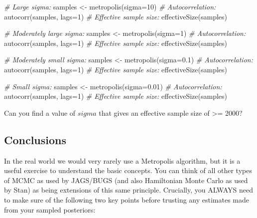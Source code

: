 \documentclass[
  12pt,
]{article}
\newenvironment{Shaded}{\begin{snugshade}}{\end{snugshade}}
\newcommand{\AttributeTok}[1]{\textcolor[rgb]{0.77,0.63,0.00}{#1}}
\newcommand{\CommentTok}[1]{\textcolor[rgb]{0.56,0.35,0.01}{\textit{#1}}}
\newcommand{\DecValTok}[1]{\textcolor[rgb]{0.00,0.00,0.81}{#1}}
\newcommand{\FloatTok}[1]{\textcolor[rgb]{0.00,0.00,0.81}{#1}}
\newcommand{\FunctionTok}[1]{\textcolor[rgb]{0.00,0.00,0.00}{#1}}
\newcommand{\NormalTok}[1]{#1}
\newcommand{\OtherTok}[1]{\textcolor[rgb]{0.56,0.35,0.01}{#1}}
\begin{document}
\begin{Shaded}
\begin{Highlighting}[]
\CommentTok{\# Large sigma:}
\NormalTok{samples }\OtherTok{\textless{}{-}} \FunctionTok{metropolis}\NormalTok{(}\AttributeTok{sigma=}\DecValTok{10}\NormalTok{)}
\CommentTok{\# Autocorrelation:}
\FunctionTok{autocorr}\NormalTok{(samples, }\AttributeTok{lags=}\DecValTok{1}\NormalTok{)}
\CommentTok{\# Effective sample size:}
\FunctionTok{effectiveSize}\NormalTok{(samples)}

\CommentTok{\# Moderately large sigma:}
\NormalTok{samples }\OtherTok{\textless{}{-}} \FunctionTok{metropolis}\NormalTok{(}\AttributeTok{sigma=}\DecValTok{1}\NormalTok{)}
\CommentTok{\# Autocorrelation:}
\FunctionTok{autocorr}\NormalTok{(samples, }\AttributeTok{lags=}\DecValTok{1}\NormalTok{)}
\CommentTok{\# Effective sample size:}
\FunctionTok{effectiveSize}\NormalTok{(samples)}

\CommentTok{\# Moderately small sigma:}
\NormalTok{samples }\OtherTok{\textless{}{-}} \FunctionTok{metropolis}\NormalTok{(}\AttributeTok{sigma=}\FloatTok{0.1}\NormalTok{)}
\CommentTok{\# Autocorrelation:}
\FunctionTok{autocorr}\NormalTok{(samples, }\AttributeTok{lags=}\DecValTok{1}\NormalTok{)}
\CommentTok{\# Effective sample size:}
\FunctionTok{effectiveSize}\NormalTok{(samples)}

\CommentTok{\# Small sigma:}
\NormalTok{samples }\OtherTok{\textless{}{-}} \FunctionTok{metropolis}\NormalTok{(}\AttributeTok{sigma=}\FloatTok{0.01}\NormalTok{)}
\CommentTok{\# Autocorrelation:}
\FunctionTok{autocorr}\NormalTok{(samples, }\AttributeTok{lags=}\DecValTok{1}\NormalTok{)}
\CommentTok{\# Effective sample size:}
\FunctionTok{effectiveSize}\NormalTok{(samples)}
\end{Highlighting}
\end{Shaded}

Can you find a value of \(sigma\) that gives an effective sample size of
\textgreater= 2000?

\hypertarget{conclusions}{%
\subsection{Conclusions}\label{conclusions}}

In the real world we would very rarely use a Metropolis algorithm, but
it is a useful exercise to understand the basic concepts. You can think
of all other types of MCMC as used by JAGS/BUGS (and also Hamiltonian
Monte Carlo as used by Stan) as being extensions of this same principle.
Crucially, you ALWAYS need to make sure of the following two key points
before trusting any estimates made from your sampled posteriors:
\end{document}
